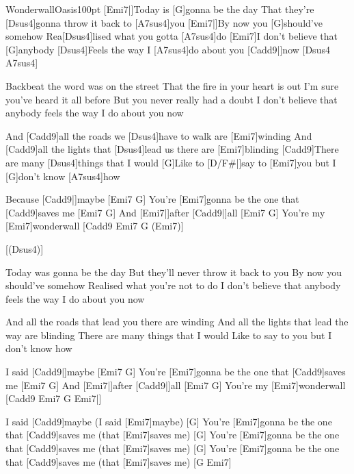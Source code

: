 \begin{song}{Wonderwall}{Oasis}{100pt}
%
[Emi7|]{}Today is [G]gonna be the day
That they're [Dsus4]gonna throw it back to [A7sus4]you
[Emi7|]{}By now you [G]should've somehow
Rea[Dsus4]lised what you gotta [A7sus4]do
[Emi7]I don't believe that [G]anybody
[Dsus4]Feels the way I [A7sus4]do about you [Cadd9|]{now} [Dsus4 A7sus4]{}

%
Backbeat the word was on the street
That the fire in your heart is out
I'm sure you've heard it all before
But you never really had a doubt
I don't believe that anybody 
feels the way I do about you now

\verse{*}%
And [Cadd9]all the roads we [Dsus4]have to walk are [Emi7]winding
And [Cadd9]all the lights that [Dsus4]lead us there are [Emi7]blinding
[Cadd9]There are many [Dsus4]things that I would
[G]Like to [D/F#|]{say} to [Emi7]you
but I [G]don't know [A7sus4]how

\chorus%
Because [Cadd9|]{maybe} [Emi7 G]{}
You're [Emi7]gonna be the one that [Cadd9]saves me [Emi7 G]{}
And [Emi7|]{after} [Cadd9|]{all} [Emi7 G]{}
You're my [Emi7]wonderwall [Cadd9 Emi7 G (Emi7)]{}

[(Dsus4)]{}

%
Today was gonna be the day
But they'll never throw it back to you
By now you should've somehow
Realised what you're not to do
I don't believe that anybody
feels the way I do about you now

\verse{*}%
And all the roads that lead you there are winding
And all the lights that lead the way are blinding
There are many things that I would
Like to say to you
but I don't know how

\chorus%
\rl I said [Cadd9|]{maybe} [Emi7 G]{}
You're [Emi7]gonna be the one that [Cadd9]saves me [Emi7 G]{}
And [Emi7|]{after} [Cadd9|]{all} [Emi7 G]{}
You're my [Emi7]wonderwall [Cadd9 Emi7 G Emi7|]{}\rr{}

I said [Cadd9]maybe (I said [Emi7]maybe) [G]{}
You're [Emi7]gonna be the one that [Cadd9]saves me (that [Emi7]saves me) [G]{}
You're [Emi7]gonna be the one that [Cadd9]saves me (that [Emi7]saves me) [G]{}
You're [Emi7]gonna be the one that [Cadd9]saves me (that [Emi7]saves me) [G Emi7]{}
\end{song}
\vskip 20pt
\hfil
{}
